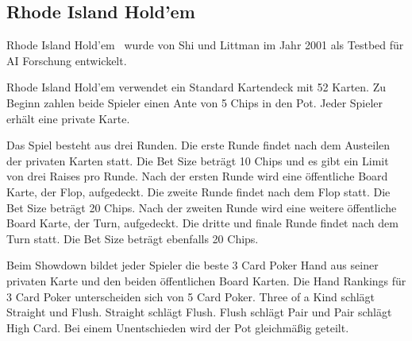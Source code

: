 \subsection{Rhode Island Hold'em}
Rhode Island Hold'em~\cite{shi2001rhode} wurde von Shi und Littman im Jahr 2001 als Testbed für AI Forschung entwickelt.

Rhode Island Hold'em verwendet ein Standard Kartendeck mit 52 Karten.
Zu Beginn zahlen beide Spieler einen Ante von 5 Chips in den Pot.
Jeder Spieler erhält eine private Karte.

Das Spiel besteht aus drei Runden.
Die erste Runde findet nach dem Austeilen der privaten Karten statt.
Die Bet Size beträgt 10 Chips und es gibt ein Limit von drei Raises pro Runde.
Nach der ersten Runde wird eine öffentliche Board Karte, der Flop, aufgedeckt.
Die zweite Runde findet nach dem Flop statt.
Die Bet Size beträgt 20 Chips.
Nach der zweiten Runde wird eine weitere öffentliche Board Karte, der Turn, aufgedeckt.
Die dritte und finale Runde findet nach dem Turn statt.
Die Bet Size beträgt ebenfalls 20 Chips.

Beim Showdown bildet jeder Spieler die beste 3 Card Poker Hand aus seiner privaten Karte und den beiden öffentlichen Board Karten.
Die Hand Rankings für 3 Card Poker unterscheiden sich von 5 Card Poker.
Three of a Kind schlägt Straight und Flush.
Straight schlägt Flush.
Flush schlägt Pair und Pair schlägt High Card.
Bei einem Unentschieden wird der Pot gleichmäßig geteilt.

